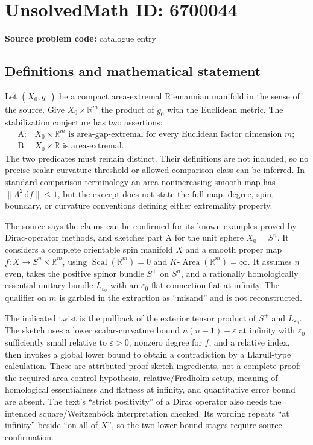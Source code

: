 \documentclass[11pt]{article}
\newcommand{\dd}{\,\mathrm{d}}
\begin{document}
\section*{UnsolvedMath ID: 6700044}
\textbf{Source problem code:} catalogue entry
\subsection{Definitions and mathematical statement}
Let \((X_0,g_0)\) be a compact area-extremal Riemannian manifold in the sense of the source. Give \(X_0\times\mathbb R^m\) the product of \(g_0\) with the Euclidean metric. The stabilization conjecture has two assertions:
\[
 \begin{array}{ll}
 \mathrm{A}:&X_0\times\mathbb R^m\text{ is area-gap-extremal for every Euclidean factor dimension }m;\\
 \mathrm{B}:&X_0\times\mathbb R\text{ is area-extremal}.
 \end{array}
\]
The two predicates must remain distinct. Their definitions are not included, so no precise scalar-curvature threshold or allowed comparison class can be inferred. In standard comparison terminology an area-nonincreasing smooth map has \(\|\Lambda^2\dd f\|\le1\), but the excerpt does not state the full map, degree, spin, boundary, or curvature conventions defining either extremality property.

The source says the claims can be confirmed for its known examples proved by Dirac-operator methods, and sketches part A for the unit sphere \(X_0=S^n\). It considers a complete orientable spin manifold \(X\) and a smooth proper map \(f:X\to S^n\times\mathbb R^m\), using \(\operatorname{Scal}(\mathbb R^m)=0\) and \(K\text{-}\operatorname{Area}(\mathbb R^m)=\infty\). It assumes \(n\) even, takes the positive spinor bundle \(S^+\) on \(S^n\), and a rationally homologically essential unitary bundle \(L_{\varepsilon_0}\) with an \(\varepsilon_0\)-flat connection flat at infinity. The qualifier on \(m\) is garbled in the extraction as ``misand'' and is not reconstructed.

The indicated twist is the pullback of the exterior tensor product of \(S^+\) and \(L_{\varepsilon_0}\). The sketch uses a lower scalar-curvature bound \(n(n-1)+\varepsilon\) at infinity with \(\varepsilon_0\) sufficiently small relative to \(\varepsilon>0\), nonzero degree for \(f\), and a relative index, then invokes a global lower bound to obtain a contradiction by a Llarull-type calculation. These are attributed proof-sketch ingredients, not a complete proof: the required area-control hypothesis, relative/Fredholm setup, meaning of homological essentialness and flatness at infinity, and quantitative error bound are absent. The text's ``strict positivity'' of a Dirac operator also needs the intended square/Weitzenb\"ock interpretation checked. Its wording repeats ``at infinity'' beside ``on all of \(X\)'', so the two lower-bound stages require source confirmation.
\end{document}
